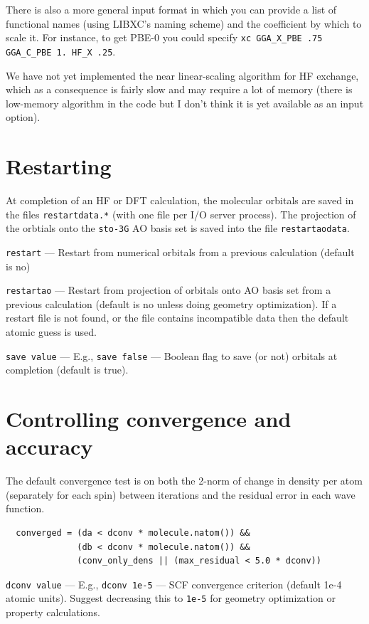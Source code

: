 \documentclass[letterpaper]{book}
\begin{document}
There is also a more general input format in which you can provide a list of functional names (using LIBXC's naming scheme) and the coefficient by which to scale it.  For instance, to get PBE-0 you could specify
\verb+xc GGA_X_PBE .75 GGA_C_PBE 1. HF_X .25+.

We have not yet implemented the near linear-scaling algorithm for HF
exchange, which as a consequence is fairly slow and may require a lot
of memory (there is low-memory algorithm in the code but I don't think
it is yet available as an input option).

\section{Restarting}

At completion of an HF or DFT calculation, the molecular orbitals are
saved in the files \verb+restartdata.*+ (with one file per I/O server
process).  The projection of the orbtials onto the {\tt sto-3G} AO basis
set is saved into the file {\tt restartaodata}.

{\tt restart} --- Restart from numerical orbitals from a previous calculation (default is no)

{\tt restartao} --- Restart from projection of orbitals onto AO basis
set from a previous calculation (default is no unless doing geometry
optimization).  If a restart file is not found, or the file contains
incompatible data then the default atomic guess is used.

{\tt save value} --- E.g., {\tt save false} --- Boolean flag to save (or not) orbitals at completion (default is true).

\section{Controlling convergence and accuracy}

The default convergence test is on both the 2-norm of change in density per atom (separately for each spin) between iterations and the residual error in each wave function.

\begin{verbatim}
  converged = (da < dconv * molecule.natom()) && 
              (db < dconv * molecule.natom()) &&
              (conv_only_dens || (max_residual < 5.0 * dconv))
\end{verbatim}

{\tt dconv value} --- E.g., {\tt dconv 1e-5} --- SCF convergence criterion (default 1e-4 atomic units).  Suggest decreasing this to {\tt 1e-5} for geometry optimization or property calculations.
\end{document}
